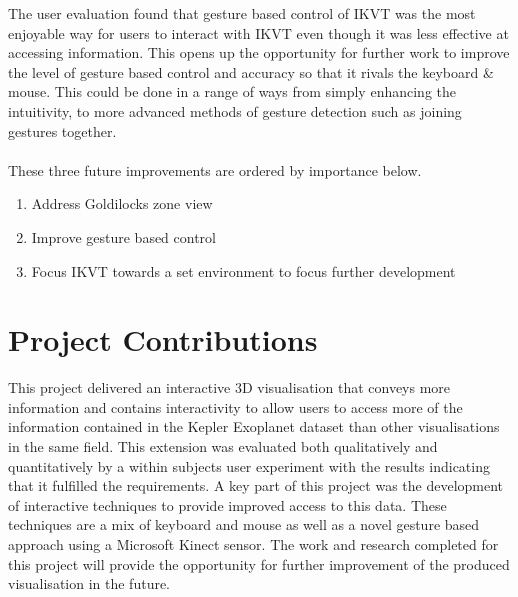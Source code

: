 The user evaluation found that gesture based control of IKVT was the most
enjoyable way for users to interact with IKVT even though it was less effective
at accessing information. This opens up the opportunity for further work to
improve the level of gesture based control and accuracy so that it rivals the
keyboard \& mouse. This could be done in a range of ways from simply enhancing
the intuitivity, to more advanced methods of gesture detection such as joining
gestures together.
\\\\ 
These three future improvements are ordered by importance below.
\begin{enumerate}
 \item Address Goldilocks zone view
 \item Improve gesture based control
 \item Focus IKVT towards a set environment to focus further development
\end{enumerate}

\section{Project Contributions}
This project delivered an interactive 3D visualisation that conveys more
information and contains interactivity to allow users to access more of the
information contained in the Kepler Exoplanet dataset than other visualisations
in the same field. This
extension was evaluated both qualitatively and quantitatively by a within
subjects user experiment with the results indicating that it fulfilled the
requirements.
A key part of this project was the development of interactive techniques to
provide improved access to this data. These techniques are a mix of keyboard and
mouse as well as a novel gesture based approach using a Microsoft Kinect sensor.
The work and research completed for this project will provide the opportunity
for further improvement of the produced visualisation in the future.
